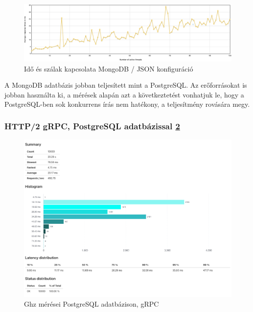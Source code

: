 \begin{figure}[hbt!]
    \centering
    \includegraphics[scale=0.3]{images/json-mongo-time-vs-threads}
    \caption{Idő és szálak kapcsolata MongoDB / JSON konfiguráció}
    \label{fig:json-mongo-time-vs-threads}
\end{figure}
\begin{remark}
    A MongoDB adatbázis jobban teljesített mint a PostgreSQL.
    Az erőforrásokat is jobban használta ki, a mérések alapán azt a következtetést vonhatjuk le, hogy a PostgreSQL-ben sok konkurrens írás nem hatékony, a teljesítmény rovására megy.
\end{remark}


\subsubsection{HTTP/2 gRPC, PostgreSQL adatbázissal \ref{fig:ghz-postgres}}

\begin{figure}[hbt!]
    \centering
    \includegraphics[scale=0.3]{images/ghz-postgres}
    \caption{Ghz mérései PostgreSQL adatbázison, gRPC}
    \label{fig:ghz-postgres}
\end{figure}

